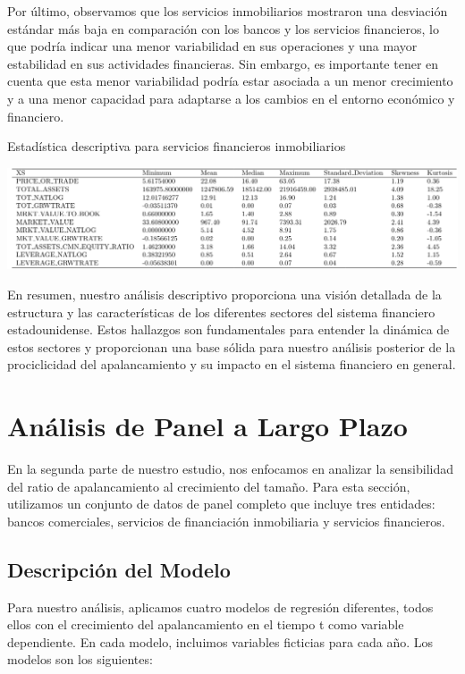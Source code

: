 \documentclass[a4paper,fleqn]{cas-sc}
\begin{document}
Por último, observamos que los servicios inmobiliarios mostraron una desviación estándar más baja en comparación con los bancos y los servicios financieros, lo que podría indicar una menor variabilidad en sus operaciones y una mayor estabilidad en sus actividades financieras. Sin embargo, es importante tener en cuenta que esta menor variabilidad podría estar asociada a un menor crecimiento y a una menor capacidad para adaptarse a los cambios en el entorno económico y financiero.

\begin{table}[h]
    \centering
    \caption{Estadística descriptiva para servicios financieros inmobiliarios}
    \includegraphics[width=1\textwidth]{tabla4.png}
\end{table}

En resumen, nuestro análisis descriptivo proporciona una visión detallada de la estructura y las características de los diferentes sectores del sistema financiero estadounidense. Estos hallazgos son fundamentales para entender la dinámica de estos sectores y proporcionan una base sólida para nuestro análisis posterior de la prociclicidad del apalancamiento y su impacto en el sistema financiero en general.

\section{Análisis de Panel a Largo Plazo}
En la segunda parte de nuestro estudio, nos enfocamos en analizar la sensibilidad del ratio de apalancamiento al crecimiento del tamaño. Para esta sección, utilizamos un conjunto de datos de panel completo que incluye tres entidades: bancos comerciales, servicios de financiación inmobiliaria y servicios financieros.
\subsection{Descripción del Modelo}
Para nuestro análisis, aplicamos cuatro modelos de regresión diferentes, todos ellos con el crecimiento del apalancamiento en el tiempo t como variable dependiente. En cada modelo, incluimos variables ficticias para cada año. Los modelos son los siguientes:
\end{document}
